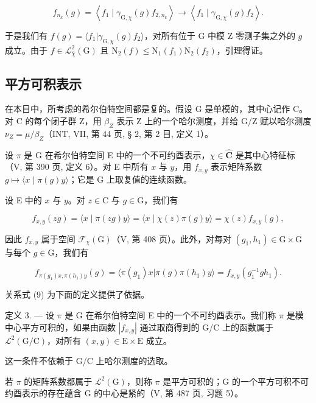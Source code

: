 \[
f _ {n _ {k}} (g) = \left\langle f _ {1} \mid \gamma_ {\mathrm{G}, \chi} (g) f _ {2, n _ {k}} \right\rangle\rightarrow \left\langle f _ {1} \mid \gamma_ {\mathrm{G}, \chi} (g) f _ {2} \right\rangle .
\]

于是我们有 \(f(g) = \langle f_1 | \gamma_{\mathrm{G},\chi}(g)f_2 \rangle\)，对所有位于 G 中模 Z 零测子集之外的 \(g\) 成立。由于 \(f \in \mathcal{L}_{\overline{\chi}}^2(\mathrm{G})\) 且 \(\mathrm{N}_2(f) \leqslant \mathrm{N}_1(f_1)\mathrm{N}_2(f_2)\)，引理得证。

\subsection{平方可积表示}

在本目中，所考虑的希尔伯特空间都是复的。假设 G 是单模的，其中心记作 C。对 C 的每个闭子群 Z，用 \(\beta_{Z}\) 表示 Z 上的一个哈尔测度，并给 G/Z 赋以哈尔测度 \(\nu_{Z} = \mu/\beta_{Z}\)（INT, VII, 第 44 页, § 2, 第 2 目, 定义 1）。

设 \(\pi\) 是 G 在希尔伯特空间 E 中的一个不可约酉表示，\(\chi \in \widehat{\mathbf{C}}\) 是其中心特征标（V, 第 390 页, 定义 6）。对 E 中所有 \(x\) 与 \(y\)，用 \(f_{x,y}\) 表示矩阵系数 \(g \mapsto \langle x \mid \pi(g)y \rangle\)；它是 G 上取复值的连续函数。

设 E 中的 \(x\) 与 \(y\)。对 \(z \in \mathrm{C}\) 与 \(g \in \mathrm{G}\)，我们有

\[
f _ {x, y} (z g) = \langle x \mid \pi (z g) y \rangle = \langle x \mid \chi (z) \pi (g) y \rangle = \chi (z) f _ {x, y} (g),\tag{9}
\]

因此 \(f_{x,y}\) 属于空间 \(\mathcal{F}_{\chi}(\mathrm{G})\)（V, 第 408 页）。此外，对每对 \((g_1, h_1) \in \mathrm{G} \times \mathrm{G}\) 与每个 \(g \in \mathrm{G}\)，我们有

\[
f _ {\pi (g _ {1}) x, \pi (h _ {1}) y} (g) = \langle \pi (g _ {1}) x | \pi (g) \pi (h _ {1}) y \rangle = f _ {x, y} (g _ {1} ^ {- 1} g h _ {1}).\tag{10}
\]

关系式 (9) 为下面的定义提供了依据。

定义 3. --- 设 \(\pi\) 是 G 在希尔伯特空间 E 中的一个不可约酉表示。我们称 \(\pi\) 是模中心平方可积的，如果由函数 \(|f_{x,y}|\) 通过取商得到的 G/C 上的函数属于 \(\mathcal{L}^2 (\mathrm{G / C})\)，对所有 \((x,y)\in \mathrm{E}\times \mathrm{E}\) 成立。

这一条件不依赖于 G/C 上哈尔测度的选取。

若 \(\pi\) 的矩阵系数都属于 \(\mathcal{L}^2 (\mathrm{G})\)，则称 \(\pi\) 是平方可积的；G 的一个平方可积不可约酉表示的存在蕴含 G 的中心是紧的（V, 第 487 页, 习题 5）。

